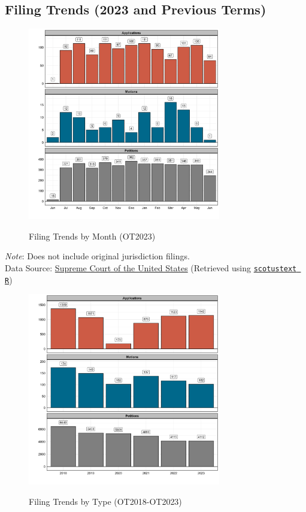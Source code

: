 \subsection{\centering Filing Trends (2023 and Previous Terms)}
\begin{figure}[H]
\centering
\caption{Filing Trends by Month (OT2023)}
\includegraphics[width = 0.75\textwidth]{"Figures/statpack_figures/dockets_ot_23.png"} \\
\end{figure}

\centering
\footnotesize{\emph{Note}: Does not include original jurisdiction filings.} \\
\footnotesize{Data Source: \href{https://www.supremecourt.gov/docket/docket.aspx}{Supreme Court of the United States} (Retrieved using \href{https://jaketruscott.github.io/scotustext/}{\texttt{scotustext R}})}

\newpage

\begin{figure}[H]
\centering
\caption{Filing Trends by Type (OT2018-OT2023)}
\includegraphics[width = 0.75\textwidth]{"Figures/statpack_figures/longitudinal_docketing_trends_2018_2023.png"} \\
\end{figure}

